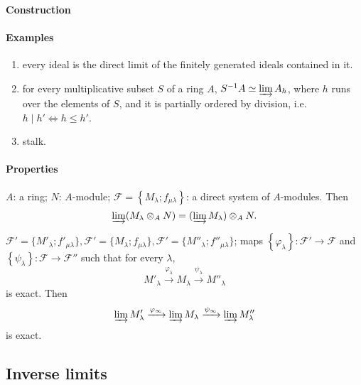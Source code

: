 \paragraph{Construction}

\paragraph{Examples}

\begin{enumerate}
  \item every ideal is the direct limit of the finitely generated ideals contained in it.
  \item for every multiplicative subset \( S \) of a ring \( A \), \( S^{-1}A \simeq \varinjlim A_h \), where \( h \) runs over the elements of \( S \), and it is partially ordered by division, i.e. \( h \mid h' \iff h \leq h' \).
  \item stalk.
\end{enumerate}

\paragraph{Properties}

\begin{proposition}
  \( A \): a ring; \( N \): \( A \)-module; \( \mathscr{F} = \left\lbrace M_\lambda; f_{\mu \lambda} \right\rbrace \): a direct system of \( A \)-modules.
  Then
  \[
    \varinjlim (M_\lambda \otimes_A N) = (\varinjlim M_\lambda) \otimes_A N.
  \]
\end{proposition}
\begin{proposition}
  \( \mathcal{F}' = \lbrace M'_\lambda; f'_{\mu \lambda} \rbrace, \mathcal{F}' = \lbrace M_\lambda; f_{\mu \lambda} \rbrace, \mathcal{F}' = \lbrace M''_\lambda; f''_{\mu \lambda} \rbrace \); maps \( \left\lbrace \varphi_\lambda \right\rbrace: \mathscr{F}' \to \mathscr{F} \) and \( \left\lbrace \psi_\lambda \right\rbrace: \mathscr{F} \to \mathscr{F}'' \) such that for every \( \lambda \),
  \[
    M'_\lambda \xrightarrow{\varphi_\lambda} M_\lambda \xrightarrow{\psi_\lambda} M''_\lambda
  \]
  is exact.
  Then
  \[
    \varinjlim M'_\lambda \xrightarrow{\varphi_\infty} \varinjlim M_\lambda \xrightarrow{\psi_\infty} \varinjlim M''_\lambda
  \]
  is exact.
\end{proposition}

\subsection{Inverse limits}

